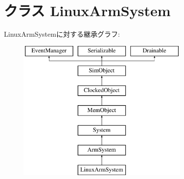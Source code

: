 \hypertarget{classArmSystem_1_1LinuxArmSystem}{
\section{クラス LinuxArmSystem}
\label{classArmSystem_1_1LinuxArmSystem}
}
LinuxArmSystemに対する継承グラフ:\begin{figure}[H]
\begin{center}
\leavevmode
\includegraphics[height=7cm]{classArmSystem_1_1LinuxArmSystem}
\end{center}
\end{figure}
